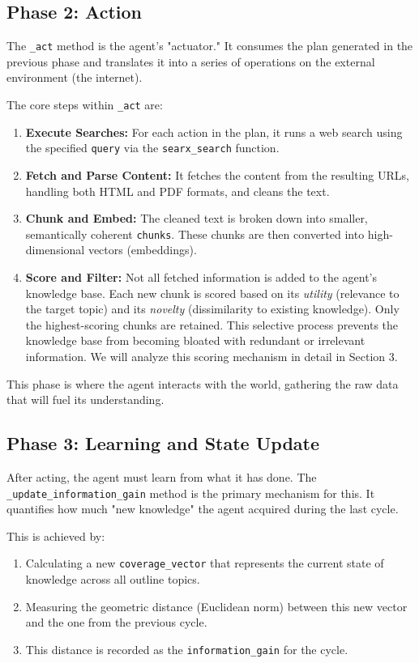 \documentclass[12pt, a4paper]{article}
\begin{document}
\subsection{Phase 2: Action}

The \verb|_act| method is the agent's "actuator." It consumes the plan generated in the previous phase and translates it into a series of operations on the external environment (the internet).

The core steps within \verb|_act| are:
\begin{enumerate}
    \item \textbf{Execute Searches:} For each action in the plan, it runs a web search using the specified \verb|query| via the \verb|searx_search| function.
    \item \textbf{Fetch and Parse Content:} It fetches the content from the resulting URLs, handling both HTML and PDF formats, and cleans the text.
    \item \textbf{Chunk and Embed:} The cleaned text is broken down into smaller, semantically coherent \verb|chunks|. These chunks are then converted into high-dimensional vectors (embeddings).
    \item \textbf{Score and Filter:} Not all fetched information is added to the agent's knowledge base. Each new chunk is scored based on its \textit{utility} (relevance to the target topic) and its \textit{novelty} (dissimilarity to existing knowledge). Only the highest-scoring chunks are retained. This selective process prevents the knowledge base from becoming bloated with redundant or irrelevant information. We will analyze this scoring mechanism in detail in Section 3.
\end{enumerate}

This phase is where the agent interacts with the world, gathering the raw data that will fuel its understanding.

\subsection{Phase 3: Learning and State Update}

After acting, the agent must learn from what it has done. The \verb|_update_information_gain| method is the primary mechanism for this. It quantifies how much "new knowledge" the agent acquired during the last cycle.

This is achieved by:
\begin{enumerate}
    \item Calculating a new \verb|coverage_vector| that represents the current state of knowledge across all outline topics.
    \item Measuring the geometric distance (Euclidean norm) between this new vector and the one from the previous cycle.
    \item This distance is recorded as the \verb|information_gain| for the cycle.
\end{enumerate}
\end{document}
